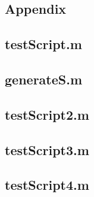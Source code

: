 \documentclass[12pt]{report}
\begin{document}
\begin{appendices}
\chapter{Appendix}
\section{testScript.m}

\section{generateS.m}

\section{testScript2.m}

\section{testScript3.m}

\section{testScript4.m}

\end{appendices}
\end{document}
